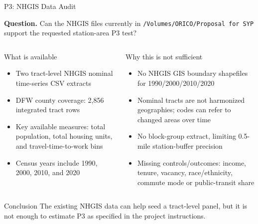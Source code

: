 \documentclass[10pt]{beamer}
\begin{document}
\begin{frame}[shrink=7]{P3: NHGIS Data Audit}

\textbf{Question.} Can the NHGIS files currently in
\texttt{/Volumes/ORICO/Proposal for SYP} support the requested station-area P3 test?

\medskip
\begin{columns}[T]
\begin{block}{What is available}
\small
\begin{itemize}
  \item Two tract-level NHGIS nominal time-series CSV extracts
  \item DFW county coverage: 2,856 integrated tract rows
  \item Key available measures: total population, total housing units,
        and travel-time-to-work bins
  \item Census years include 1990, 2000, 2010, and 2020
\end{itemize}
\end{block}

\begin{alertblock}{Why this is not sufficient}
\small
\begin{itemize}
  \item No NHGIS GIS boundary shapefiles for 1990/2000/2010/2020
  \item Nominal tracts are not harmonized geographies; codes can refer to
        changed areas over time
  \item No block-group extract, limiting 0.5-mile station-buffer precision
  \item Missing controls/outcomes: income, tenure, vacancy, race/ethnicity,
        commute mode or public-transit share
\end{itemize}
\end{alertblock}
\end{columns}

\vspace{0.1cm}
\begin{alertblock}{Conclusion}
\small
The existing NHGIS data can help seed a tract-level panel, but it is not enough
to estimate P3 as specified in the project instructions.
\end{alertblock}

\end{frame}
\end{document}
